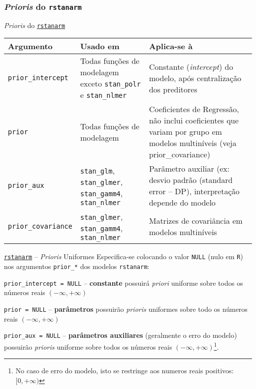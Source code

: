 \subsubsection{\textit{Prioris} do \texttt{rstanarm}}
\begin{frame}{\textit{Prioris} do \href{http://mc-stan.org/rstanarm/}{\texttt{rstanarm}}}
    \footnotesize
    \begin{tabular}{|l|p{}|p{}|}
        \toprule
        \textbf{Argumento}         & \textbf{Usado em}                                                                    & \textbf{Aplica-se à}                                                                                                     \\ \midrule
        \texttt{prior\_intercept}  & Todas funções de modelagem exceto \texttt{stan\_polr} e \texttt{stan\_nlmer}         & Constante (\textit{intercept}) do modelo, após centralização dos preditores                                              \\ \midrule
        \texttt{prior}             & Todas funções de modelagem                                                           & Coeficientes de Regressão, não inclui coeficientes que variam por grupo em modelos multiníveis (veja prior\_covariance)  \\ \midrule
        \texttt{prior\_aux}        & \texttt{stan\_glm}, \texttt{stan\_glmer}, \texttt{stan\_gamm4}, \texttt{stan\_nlmer} & Parâmetro auxiliar (ex: desvio padrão (standard error – DP), interpretação depende do modelo                             \\ \midrule
        \texttt{prior\_covariance} & \texttt{stan\_glmer}, \texttt{stan\_gamm4}, \texttt{stan\_nlmer}                     & Matrizes de covariância em modelos multiníveis                                                                           \\
        \bottomrule
    \end{tabular}
\end{frame}

\begin{frame}{\href{http://mc-stan.org/rstanarm/}{\texttt{rstanarm}} -- \textit{Prioris} Uniformes}
    Especifica-se colocando o valor \texttt{NULL} (nulo em \texttt{R}) nos argumentos
    \texttt{prior\_*} dos modelos \texttt{rstanarm}:
    \begin{vfilleditems}
        \item \lstinline!prior_intercept = NULL! -- \textbf{constante} possuirá \textit{priori} uniforme sobre todos os números reais $(-\infty, +\infty)$
        \item \lstinline!prior = NULL! -- \textbf{parâmetros} possuirão \textit{prioris} uniformes sobre todo os números reais $(-\infty, +\infty)$
        \item \lstinline!prior_aux = NULL! -- \textbf{parâmetros auxiliares} (geralmente o erro do modelo) possuirão \textit{prioris} uniforme sobre todos os números reais $(-\infty, +\infty)$\footnote{No caso de erro do modelo, isto se restringe aos numeros reais positivos: $[0, +\infty)$}.
    \end{vfilleditems}
\end{frame}

